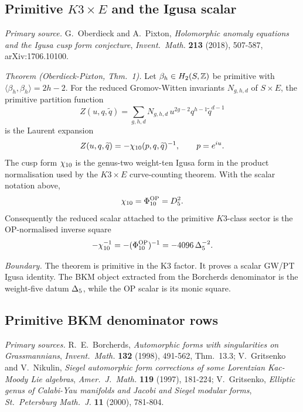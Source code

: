 \subsection*{Primitive \(K3\times E\) and the Igusa scalar}

\emph{Primary source.} G.~Oberdieck and A.~Pixton,
\emph{Holomorphic anomaly equations and the Igusa cusp form
conjecture}, \emph{Invent.\ Math.} \textbf{213} (2018), 507-587,
arXiv:1706.10100.

\emph{Theorem (Oberdieck-Pixton, Thm.~1).}
Let \(\beta_h\in H_2(S,\mathbb{Z})\) be primitive with
\(\langle\beta_h,\beta_h\rangle=2h-2\). For the reduced
Gromov-Witten invariants \(N_{g,h,d}\) of \(S\times E\), the
primitive partition function
\[
  Z(u,q,\widetilde q)
  =
  \sum_{g,h,d} N_{g,h,d}\,
  u^{2g-2}q^{h-1}\widetilde q^{d-1}
\]
is the Laurent expansion
\[
  Z(u,q,\widetilde q)
  =
  -\chi_{10}(p,q,\widetilde q)^{-1},
  \qquad p=e^{iu}.
\]
The cusp form \(\chi_{10}\) is the genus-two weight-ten Igusa form in the
product normalisation used by the \(K3\times E\) curve-counting
theorem. With the scalar notation above,
\[
  \chi_{10}=\Phi_{10}^{\mathrm{OP}}=D_5^2.
\]
Consequently the reduced scalar attached to the primitive \(K3\)-class
sector is the OP-normalised inverse square
\[
  -\chi_{10}^{-1}
  =
  -(\Phi_{10}^{\mathrm{OP}})^{-1}
  =
  -4096\,\Delta_5^{-2}.
\]

\emph{Boundary.} The theorem is primitive in the K3 factor. It proves a
scalar GW/PT Igusa identity. The BKM object extracted from the
Borcherds denominator is the weight-five datum \(\Delta_5\), while
the OP scalar is its monic square.

\subsection*{Primitive BKM denominator rows}

\emph{Primary sources.} R.~E.~Borcherds,
\emph{Automorphic forms with singularities on Grassmannians},
\emph{Invent.\ Math.} \textbf{132} (1998), 491-562, Thm.~13.3;
V.~Gritsenko and V.~Nikulin, \emph{Siegel automorphic form corrections
of some Lorentzian Kac-Moody Lie algebras}, \emph{Amer.\ J.\ Math.}
\textbf{119} (1997), 181-224; V.~Gritsenko, \emph{Elliptic genus of
Calabi-Yau manifolds and Jacobi and Siegel modular forms}, \emph{St.\
Petersburg Math.\ J.} \textbf{11} (2000), 781-804.

